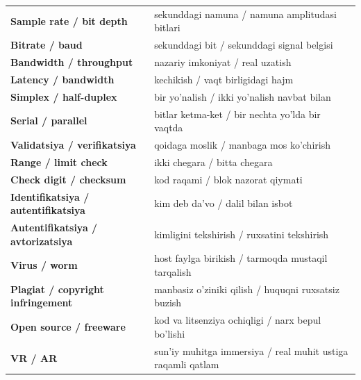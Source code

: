 \documentclass[11pt,a4paper,oneside]{book}
\begin{document}
\begin{longtable}{>{\bfseries\color{teal}}p{45mm}p{105mm}}
Sample rate / bit depth & sekunddagi namuna / namuna amplitudasi bitlari\\
Bitrate / baud & sekunddagi bit / sekunddagi signal belgisi\\
Bandwidth / throughput & nazariy imkoniyat / real uzatish\\
Latency / bandwidth & kechikish / vaqt birligidagi hajm\\
Simplex / half-duplex & bir yo'nalish / ikki yo'nalish navbat bilan\\
Serial / parallel & bitlar ketma-ket / bir nechta yo'lda bir vaqtda\\
Validatsiya / verifikatsiya & qoidaga moslik / manbaga mos ko'chirish\\
Range / limit check & ikki chegara / bitta chegara\\
Check digit / checksum & kod raqami / blok nazorat qiymati\\
Identifikatsiya / autentifikatsiya & kim deb da'vo / dalil bilan isbot\\
Autentifikatsiya / avtorizatsiya & kimligini tekshirish / ruxsatini tekshirish\\
Virus / worm & host faylga birikish / tarmoqda mustaqil tarqalish\\
Plagiat / copyright infringement & manbasiz o'ziniki qilish / huquqni ruxsatsiz buzish\\
Open source / freeware & kod va litsenziya ochiqligi / narx bepul bo'lishi\\
VR / AR & sun'iy muhitga immersiya / real muhit ustiga raqamli qatlam\\
\bottomrule
\end{longtable}
\end{document}
